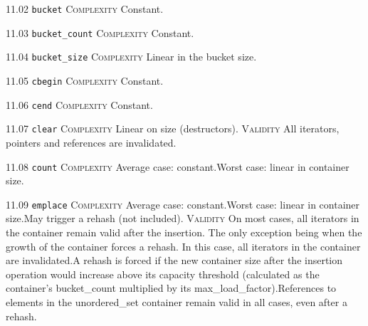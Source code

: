 \noindent\textcolor{cgreen}{11.02 \texttt{bucket}} \textsc{Complexity} Constant. \vspace{0.5em}

\noindent\textcolor{cgreen}{11.03 \texttt{bucket\_count}} \textsc{Complexity} Constant. \vspace{0.5em}

\noindent\textcolor{corange}{11.04 \texttt{bucket\_size}} \textsc{Complexity} Linear in the bucket size. \vspace{0.5em}

\noindent\textcolor{cgreen}{11.05 \texttt{cbegin}} \textsc{Complexity} Constant. \vspace{0.5em}

\noindent\textcolor{cgreen}{11.06 \texttt{cend}} \textsc{Complexity} Constant. \vspace{0.5em}

\noindent\textcolor{corange}{11.07 \texttt{clear}} \textsc{Complexity} Linear on size (destructors). \textsc{Validity} All iterators, pointers and references are invalidated.\vspace{0.5em}

\noindent\textcolor{corange}{11.08 \texttt{count}} \textsc{Complexity} Average case: constant.Worst case: linear in container size. \vspace{0.5em}

\noindent\textcolor{corange}{11.09 \texttt{emplace}} \textsc{Complexity} Average case: constant.Worst case: linear in container size.May trigger a rehash (not included). \textsc{Validity} On most cases, all iterators in the container remain valid after the insertion. The only exception being when the growth of the container forces a rehash. In this case, all iterators in the container are invalidated.A rehash is forced if the new container size after the insertion operation would increase above its capacity threshold (calculated as the container's bucket\_count multiplied by its max\_load\_factor).References to elements in the unordered\_set container remain valid in all cases, even after a rehash.\vspace{0.5em}

